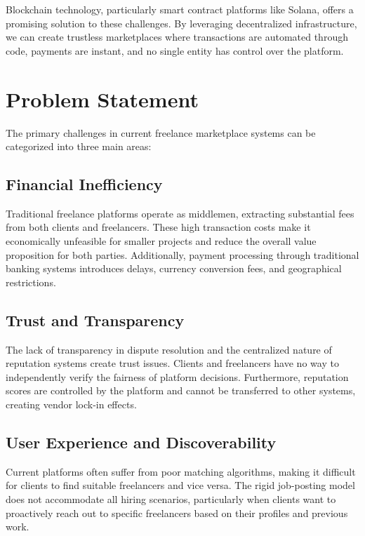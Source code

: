 \documentclass[a4paper,13pt,twoside]{report}
\theoremstyle{definition}
\begin{document}
Blockchain technology, particularly smart contract platforms like Solana, offers a promising solution to these challenges. By leveraging decentralized infrastructure, we can create trustless marketplaces where transactions are automated through code, payments are instant, and no single entity has control over the platform.

\section{Problem Statement}

The primary challenges in current freelance marketplace systems can be categorized into three main areas:

\subsection{Financial Inefficiency}

Traditional freelance platforms operate as middlemen, extracting substantial fees from both clients and freelancers. These high transaction costs make it economically unfeasible for smaller projects and reduce the overall value proposition for both parties. Additionally, payment processing through traditional banking systems introduces delays, currency conversion fees, and geographical restrictions.

\subsection{Trust and Transparency}

The lack of transparency in dispute resolution and the centralized nature of reputation systems create trust issues. Clients and freelancers have no way to independently verify the fairness of platform decisions. Furthermore, reputation scores are controlled by the platform and cannot be transferred to other systems, creating vendor lock-in effects.

\subsection{User Experience and Discoverability}

Current platforms often suffer from poor matching algorithms, making it difficult for clients to find suitable freelancers and vice versa. The rigid job-posting model does not accommodate all hiring scenarios, particularly when clients want to proactively reach out to specific freelancers based on their profiles and previous work.
\end{document}
